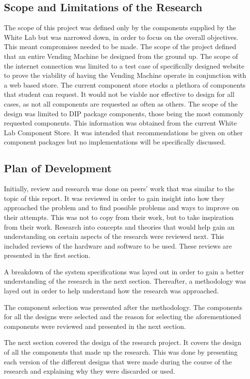 \documentclass[a4paper,11pt]{article}
\numberwithin{figure}{section}
\numberwithin{table}{section}
\begin{document}
	\subsection{Scope and Limitations of the Research}
The scope of this project was defined only by the components supplied by the White Lab but was narrowed down, in order to focus on the overall objectives. This meant compromises needed to be made. The scope of the project defined that an entire Vending Machine be designed from the ground up. The scope of the internet connection was limited to a test case of specifically designed website to prove the viability of having the Vending Machine operate in conjunction with a web based store. The current component store stocks a plethora of components that student can request. It would not be viable nor effective to design for all cases, as not all components are requested as often as others. The scope of the design was limited to DIP package components, those being the most commonly requested components. This information was obtained from the current White Lab Component Store. It was intended that recommendations be given on other component packages but no implementations will be specifically discussed. 
	\subsection{Plan of Development}	
Initially, review and research was done on peers' work that was similar to the topic of this report. It was reviewed in order to gain insight into how they approached the problem and to find possible problems and ways to improve on their attempts. This was not to copy from their work, but to take inspiration from their work. Research into concepts and theories that would help gain an understanding on certain aspects of the research were reviewed next. This included reviews of the hardware and software to be used. These reviews are presented in the first section.

A breakdown of the system specifications was layed out in order to gain a better understanding of the research in the next section. Thereafter, a methodology was layed out in order to help understand how the research was approached. 

The component selection was presented after the methodology. The components for all the designs were selected and the reason for selecting the aforementioned components were reviewed and presented in the next section.

The next section covered the design of the research project. It covers the design of all the components that made up the research. This was done by presenting each version of the different designs that were made during the course of the research and explaining why they were discarded or used.
\end{document}
